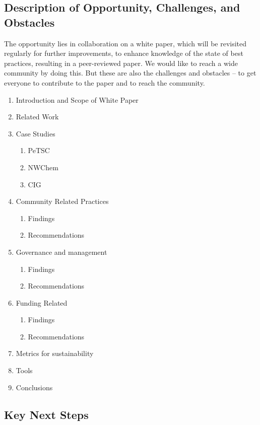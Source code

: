 \subsection{Description of Opportunity, Challenges, and Obstacles}

The opportunity lies in collaboration on a white paper, which will be revisited
regularly for further improvements, to enhance knowledge of the state of best
practices, resulting in a peer-reviewed paper. We would like to reach a wide
community by doing this. But these are also the challenges and obstacles -- to
get everyone to contribute to the paper and to reach the community.

\begin{enumerate}
\item Introduction and Scope of White Paper 
\item Related Work
\item Case Studies
\begin{enumerate} 
\item PeTSC
\item NWChem
\item CIG
\end{enumerate}
\item Community Related Practices
\begin{enumerate} 
\item Findings
\item Recommendations
\end{enumerate}
\item Governance and management
\begin{enumerate} 
\item Findings
\item Recommendations
\end{enumerate}
\item Funding Related
\begin{enumerate} 
\item Findings
\item Recommendations
\end{enumerate}
\item Metrics for sustainability
\item Tools
\item Conclusions
\end{enumerate}

\subsection{Key Next Steps}

